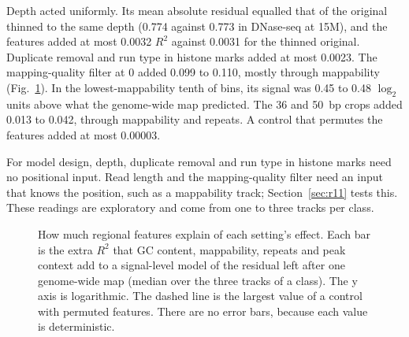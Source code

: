 \documentclass[pdflatex,sn-mathphys-num]{sn-jnl}
\newcommand{\lit}[1]{#1}
\newcommand{\cropFeatHi}{0.042}
\newcommand{\cropFeatLo}{0.013}
\newcommand{\dedupFeatHi}{0.0023}
\newcommand{\depArm}{0.774}
\newcommand{\depArmFeatHi}{0.0032}
\newcommand{\depNull}{0.773}
\newcommand{\depNullFeatHi}{0.0031}
\newcommand{\knobShufMax}{0.00003}
\newcommand{\mapqZeroDecAllHi}{0.48}
\newcommand{\mapqZeroDecAllLo}{0.45}
\newcommand{\mapqZeroHi}{0.110}
\newcommand{\mapqZeroLo}{0.099}
\begin{document}
Depth acted uniformly. Its mean absolute residual equalled that of the original thinned to
the same depth (\depArm{} against \depNull{} in DNase-seq at \lit{15}M), and the features added
at most \depArmFeatHi{} $R^{\lit{2}}$ against \depNullFeatHi{} for the thinned original.
Duplicate removal and run type in histone marks added at most \dedupFeatHi{}. The
mapping-quality filter at \lit{0} added \mapqZeroLo{} to \mapqZeroHi{}, mostly through
mappability (Fig.~\ref{fig:region}). In the lowest-mappability tenth of bins, its signal was
\mapqZeroDecAllLo{} to \mapqZeroDecAllHi{} $\log_{\lit{2}}$ units above what the genome-wide map
predicted. The \lit{36} and \lit{50}~bp crops added \cropFeatLo{} to \cropFeatHi{}, through
mappability and repeats. A control that permutes the features added at most \knobShufMax{}.

For model design, depth, duplicate removal and run type in histone marks need no positional
input. Read length and the mapping-quality filter need an input that knows the position, such
as a mappability track; Section~\ref{sec:r11} tests this. These readings are exploratory and
come from one to three tracks per class.

\begin{figure}[t]
\centering
{}
\caption{How much regional features explain of each setting's effect. Each bar is the extra
$R^{\lit{2}}$ that GC content, mappability, repeats and peak context add to a signal-level model of
the residual left after one genome-wide map (median over the three tracks of a class). The y
axis is logarithmic. The dashed line is the largest value of a control with permuted features.
There are no error bars, because each value is deterministic.}\label{fig:region}
\end{figure}
\end{document}

